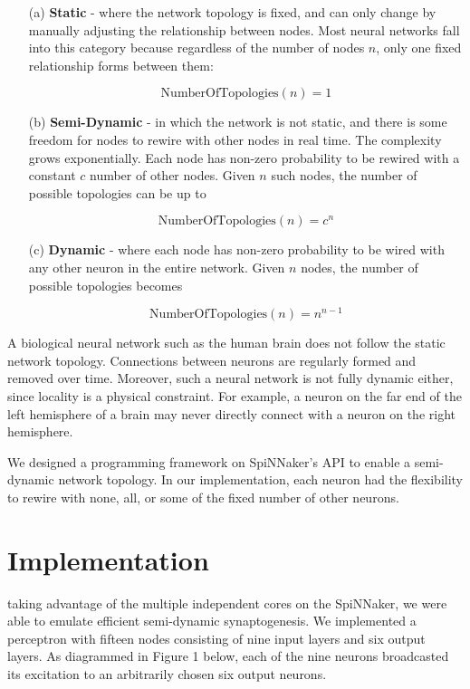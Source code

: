 \documentclass[journal]{./sty/IEEEtran}
\begin{document}
\begin{itemize}
\item[(a)] {\bf Static} - where the network topology is fixed, and can only change by manually adjusting the relationship between nodes. Most neural networks fall into this category because regardless of the number of nodes \(n\), only one fixed relationship forms between them:

\[
\text{NumberOfTopologies}(n) = 1
\]


\item[(b)] {\bf Semi-Dynamic} - in which the network is not static, and there is some freedom for nodes to rewire with other nodes in real time. The complexity grows exponentially. Each node has non-zero probability to be rewired with a constant \(c\) number of other nodes. Given \(n\) such nodes, the number of possible topologies can be up to

\[
\text{NumberOfTopologies}(n) = c^n
\]


\item[(c)] {\bf Dynamic} - where each node has non-zero probability to be wired with any other neuron in the entire network. Given \(n\) nodes, the number of possible topologies becomes

\[
\text{NumberOfTopologies}(n) = n^{n-1}
\]


\end{itemize}

A biological neural network such as the human brain does not follow the static network topology. Connections between neurons are regularly formed and removed over time. Moreover, such a neural network is not fully dynamic either, since locality is a physical constraint. For example, a neuron on the far end of the left hemisphere of a brain may never directly connect with a neuron on the right hemisphere.

We designed a programming framework on SpiNNaker's API to enable a semi-dynamic network topology. In our implementation, each neuron had the flexibility to rewire with none, all, or some of the fixed number of other neurons. 

\section{Implementation}
 taking advantage of the multiple independent cores on the SpiNNaker, we were able to emulate efficient semi-dynamic synaptogenesis. We implemented a perceptron with fifteen nodes consisting of nine input layers and six output layers. As diagrammed in Figure 1 below, each of the nine neurons broadcasted its excitation to an arbitrarily chosen six output neurons. 
\end{document}
